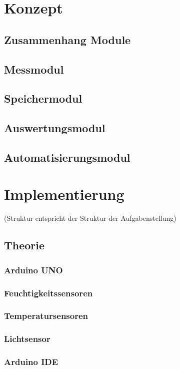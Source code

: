 \documentclass[
    load-dhbw-templates,
    load-preamble = true,
    auto-intro-pages = all,
    add-tocs-to-toc,
    debug = true,
    language = english,
    mainlanguage = ngerman,
    add-bibliography,
    bib-file = dhbw-source.bib,
    biblatex/style = alphabetic, 
]{iodhbwm}
\begin{document}
    \section{Konzept}
        \subsection{Zusammenhang Module}
        \subsection{Messmodul}
        \subsection{Speichermodul}
        \subsection{Auswertungsmodul}
        \subsection{Automatisierungsmodul}
    \section{Implementierung}
        (Struktur entspricht der Struktur der Aufgabenstellung)
        \subsection{Theorie}
            \subsubsection{Arduino UNO}
            \subsubsection{Feuchtigkeitssensoren}
            \subsubsection{Temperatursensoren}
            \subsubsection{Lichtsensor}
            \subsubsection{Arduino IDE}
\end{document}
